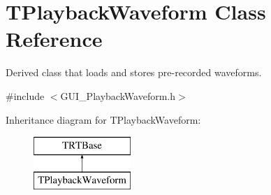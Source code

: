 \hypertarget{class_t_playback_waveform}{\section{T\+Playback\+Waveform Class Reference}
\label{class_t_playback_waveform}
}


Derived class that loads and stores pre-\/recorded waveforms.  




{\ttfamily \#include $<$G\+U\+I\+\_\+\+Playback\+Waveform.\+h$>$}

Inheritance diagram for T\+Playback\+Waveform\+:\begin{figure}[H]
\begin{center}
\leavevmode
\includegraphics[height=2.000000cm]{class_t_playback_waveform}
\end{center}
\end{figure}
